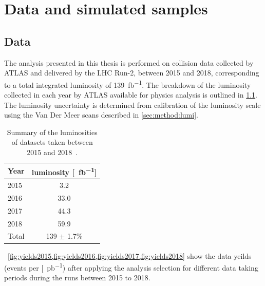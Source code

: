 \chapter{Data and simulated samples}\label{chap:datamc}

\section{Data}\label{sec:datamc:data}
The analysis presented in this thesis is performed on \emph{\protonproton} collision data collected by ATLAS and delivered by the LHC Run-2, between 2015 and 2018, corresponding to a total integrated luminosity of \SI{139}{\femto\barn^{-1}}. The breakdown of the luminosity collected in each year by ATLAS available for physics analysis is outlined in \cref{tab:data:lumi}. The luminosity uncertainty is determined from calibration of the luminosity scale using the Van Der Meer scans described in \cref{sec:method:lumi}. 
\begin{table}[h]
    \centering
    \begin{tabular}{l|c}
        Year & luminosity [\SI{}{\femto\barn^{-1}}] \\
        \hline
        2015 & 3.2 \\
        2016 & 33.0 \\
        2017 & 44.3 \\
        2018 & 59.9 \\
        \hline 
        \hline
        Total & 139 $\pm$ 1.7\% \\
	\end{tabular}
    \caption[Summary of the luminosities of datasets taken between 2015 and 2018]{Summary of the luminosities of datasets taken between 2015 and 2018~\cite{ATLAS:lumiPlots}.}
    \label{tab:data:lumi}
  \end{table}

~\cref{fig:yields2015,fig:yields2016,fig:yields2017,fig:yields2018} show the data yeilds (events per [\SI{}{\pico\barn^{-1}}) after applying the analysis selection for different data taking periods during the runs between 2015 to 2018. 


